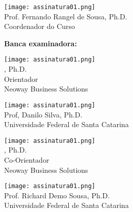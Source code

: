 \thispagestyle{empty}

\begin{center}
  \theauthor
\end{center}

\medskip
\begin{center}
  \textbf{\MakeUppercase{\thetitle}}
\end{center}

\medskip
{}



\begin{center}
	\texttt{[image: assinatura01.png]}\\
	Prof. Fernando Rangel de Sousa, Ph.D.\\
	{\footnotesize Coordenador do Curso}
\end{center}
\medskip
\textbf{Banca examinadora:}
\bigskip
\begin{center}
	\texttt{[image: assinatura01.png]}\\
	\theadvisor, Ph.D.\\
	{\footnotesize Orientador}\\
	{\footnotesize Neoway Business Solutions}
\end{center}
\begin{center}
	\texttt{[image: assinatura01.png]}\\
	Prof, Danilo Silva, Ph.D.\\
	{\footnotesize Universidade Federal de Santa Catarina}
\end{center}
\begin{center}
	\texttt{[image: assinatura01.png]}\\
	\thecoadvisor, Ph.D.\\
	{\footnotesize Co-Orientador}\\
	{\footnotesize Neoway Business Solutions}
\end{center}
\begin{center}
	\texttt{[image: assinatura01.png]}\\
	Prof. Richard Demo Sousa, Ph.D.\\
	{\footnotesize Universidade Federal de Santa Catarina}
\end{center}
\medskip

\cleardoublepageempty
